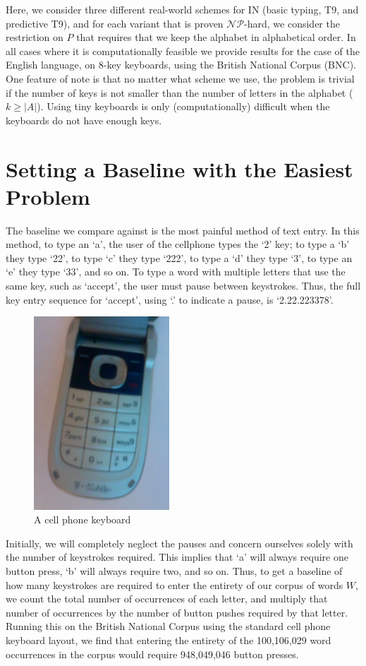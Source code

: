 \documentclass[runningheads]{llncs}
\newcommand{\NP}{\ensuremath{\mathcal{NP}}}
\begin{document}
Here, we consider three different real-world schemes
for $\mathrm{IN}$ (basic typing, T9, and predictive T9), and for each variant
that is proven \NP-hard, we consider the restriction on $P$ that requires that
we keep the alphabet in alphabetical order.  In all cases where it is
computationally feasible we provide results for the case of the English
language, on 8-key keyboards, using the British National Corpus\cite{bnc}
(BNC).  One feature of note is that no matter what scheme we use, the problem
is trivial if the number of keys is not smaller than the number of letters in
the alphabet ($k \ge |A|$).  Using tiny keyboards is only (computationally)
difficult when the keyboards do not have enough keys.

\section{Setting a Baseline with the Easiest Problem}

The baseline we compare against is the most painful method of text entry.  In this
method, to type an `a', the user of the cellphone types the `2' key; to type a
`b' they type `22', to type `c' they type `222', to type a `d' they type `3',
to type an `e' they type `33', and so on.  To type a word with multiple letters
that use the same key, such as `accept', the user must pause between
keystrokes.  Thus, the full key entry sequence for `accept', using `.' to
indicate a pause, is `2.22.223378'.

\begin{figure}[t]
\begin{center}
\includegraphics[width=2in]{phonekeys.jpg}
\end{center}
\caption{A cell phone keyboard}
\label{keypic}
\end{figure}

Initially, we will completely neglect the pauses and concern ourselves solely
with the number of keystrokes required.  This implies that `a' will always
require one button press, `b' will always require two, and so on.  Thus, to get
a baseline of how many keystrokes are required to enter the entirety of our
corpus of words $W$, we count the total number of occurrences of each letter,
and multiply that number of occurrences by the number of button pushes
required by that letter.  Running this on the British National Corpus
using the standard cell phone keyboard layout, we find that entering the
entirety of the 100,106,029 word occurrences in the corpus would require
948,049,046 button presses.  
\end{document}
